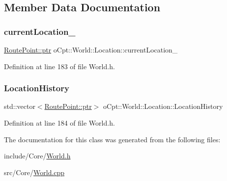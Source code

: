 \subsection{Member Data Documentation}
\hypertarget{classo_cpt_1_1_world_1_1_location_ad8835274ec8b5ea13b1c01a477bafff9}{}\label{classo_cpt_1_1_world_1_1_location_ad8835274ec8b5ea13b1c01a477bafff9} 
\subsubsection{\texorpdfstring{current\+Location\+\_\+}{currentLocation\_}}
{\footnotesize\ttfamily \hyperlink{structo_cpt_1_1_world_1_1_location_1_1_route_point_aa042feea77cb3c1531ab4e8ecf42fbd6}{Route\+Point\+::ptr} o\+Cpt\+::\+World\+::\+Location\+::current\+Location\+\_\+\hspace{0.3cm}{\ttfamily [private]}}



Definition at line 183 of file World.\+h.

\hypertarget{classo_cpt_1_1_world_1_1_location_a11e2d55bfa797b41b98e032f50911021}{}\label{classo_cpt_1_1_world_1_1_location_a11e2d55bfa797b41b98e032f50911021} 
\subsubsection{\texorpdfstring{Location\+History}{LocationHistory}}
{\footnotesize\ttfamily std\+::vector$<$\hyperlink{structo_cpt_1_1_world_1_1_location_1_1_route_point_aa042feea77cb3c1531ab4e8ecf42fbd6}{Route\+Point\+::ptr}$>$ o\+Cpt\+::\+World\+::\+Location\+::\+Location\+History\hspace{0.3cm}{\ttfamily [private]}}



Definition at line 184 of file World.\+h.



The documentation for this class was generated from the following files\+:\begin{DoxyCompactItemize}
\item 
include/\+Core/\hyperlink{_world_8h}{World.\+h}\item 
src/\+Core/\hyperlink{_world_8cpp}{World.\+cpp}\end{DoxyCompactItemize}
